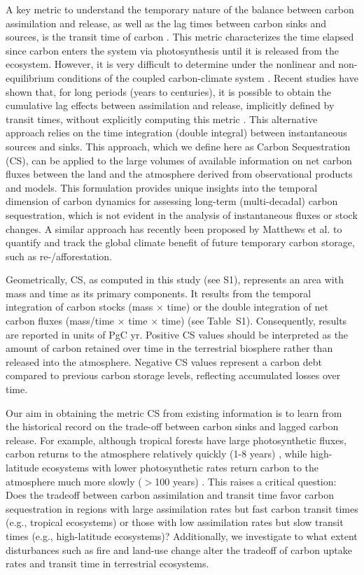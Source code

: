\documentclass[9pt,twocolumn,twoside]{pnas-new}
\begin{document}
A key metric to understand the temporary nature of the balance between carbon assimilation and release, as well as the lag times between carbon sinks and sources, is the transit time of carbon \cite{Thompson1999}. This metric characterizes the time elapsed since carbon enters the system via photosynthesis until it is released from the ecosystem. However, it is very difficult to determine under the nonlinear and non-equilibrium conditions of the coupled carbon-climate system \cite{Rasmussen2016,Metzler2018PNAS}. Recent studies have shown that, for long periods (years to centuries), it is possible to obtain the cumulative lag effects between assimilation and release, implicitly defined by transit times, without explicitly computing this metric \cite{Metzler2024,Sierra2025}. This alternative approach relies on the time integration (double integral) between instantaneous sources and sinks. This approach, which we define here as Carbon Sequestration (CS), can be applied to the large volumes of available information on net carbon fluxes between the land and the atmosphere derived from observational products and models. This formulation provides unique insights into the temporal dimension of carbon dynamics for assessing long-term (multi-decadal) carbon sequestration, which is not evident in the analysis of instantaneous fluxes or stock changes. A similar approach has recently been proposed by Matthews et al. \cite{Matthews2023} to quantify and track the global climate benefit of future temporary carbon storage, such as re-/afforestation.

Geometrically, CS, as computed in this study (see S1), represents an area with mass and time as its primary components. It results from the temporal integration of carbon stocks (mass $\times$ time) or the double integration of net carbon fluxes (mass/time $\times$ time $\times$ time) (see Table~S1). Consequently, results are reported in units of PgC yr. Positive CS values should be interpreted as the amount of carbon retained over time in the terrestrial biosphere rather than released into the atmosphere. Negative CS values represent a carbon debt compared to previous carbon storage levels, reflecting accumulated losses over time.

Our aim in obtaining the metric CS from existing information is to learn from the historical record on the trade-off between carbon sinks and lagged carbon release. For example, although tropical forests have large photosynthetic fluxes, carbon returns to the atmosphere relatively quickly (1-8 years) \cite{Sierra2021JE,Chanca2025}, while high-latitude ecosystems with lower photosynthetic rates return carbon to the atmosphere much more slowly ($>$100 years) \cite{Carvalhais2014, Lu2018}. This raises a critical question: Does the tradeoff between carbon assimilation and transit time favor carbon sequestration in regions with large assimilation rates but fast carbon transit times (e.g., tropical ecosystems) or those with low assimilation rates but slow transit times (e.g., high-latitude ecosystems)? Additionally, we investigate to what extent disturbances such as fire and land-use change alter the tradeoff of carbon uptake rates and transit time in terrestrial ecosystems.
\end{document}
